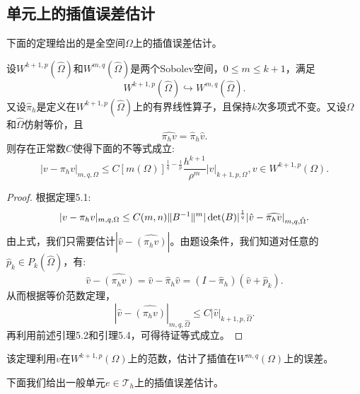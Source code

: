\subsection{单元上的插值误差估计}
下面的定理给出的是全空间$\Omega$上的插值误差估计。
\begin{theorem}
    设$W^{k+1,p}(\hat{\Omega})$和$W^{m,q}(\hat{\Omega})$是两个Sobolev空间，$0\le m\le k+1$，满足
    \begin{equation}
        W^{k+1,p}(\hat{\Omega})\hookrightarrow W^{m,q}(\hat{\Omega}).
    \end{equation}
    又设$\hat{\pi}_{h}$是定义在$W^{k+1,p}(\hat{\Omega})$上的有界线性算子，且保持$k$次多项式不变。又设$\Omega$和$\hat{\Omega}$仿射等价，且
    \begin{equation}
        \widehat{\pi_{h}v}=\hat{\pi}_{h}\hat{v}.
    \end{equation}
    则存在正常数$C$使得下面的不等式成立:
    \begin{equation}
        |v-\pi_{h}v|_{m,q,\Omega}\le C\left[m(\Omega)\right]^{\frac{1}{q}-\frac{1}{p}}\frac{h^{k+1}}{\rho^{m}}|v|_{k+1,p,\Omega},v\in W^{k+1,p}(\Omega).
    \end{equation}
\end{theorem}
\begin{proof}
    根据定理5.1:
    \begin{equation}
        |v-\pi_{h}v|_{m,q,\Omega}\le C(m,n)\|B^{-1}\|^{m}|\det(B)|^{\frac{1}{q}}|\hat{v}-\widehat{\pi_{h}v}|_{m,q,\hat{\Omega}}.
    \end{equation}
    由上式，我们只需要估计$|\hat{v}-\widehat{(\pi_{h}v)}|$。由题设条件，我们知道对任意的$\hat{p}_{k}\in P_{k}(\widehat{\Omega})$，有:
    \begin{equation}
        \hat{v}-\widehat{(\pi_{h}v)}=\hat{v}-\hat{\pi}_{h}\hat{v}=(I-\hat{\pi}_{h})(\hat{v}+\hat{p}_{k}).
    \end{equation}
    从而根据等价范数定理，
    \begin{equation}
        |\hat{v}-\widehat{(\pi_{h}v)}|_{m,q,\hat{\Omega}}\le C|\hat{v}|_{k+1,p,\hat{\Omega}}.
    \end{equation}
    再利用前述引理5.2和引理5.4，可得待证等式成立。
\end{proof}
\begin{remark}
    该定理利用$v$在$W^{k+1,p}(\Omega)$上的范数，估计了插值在$W^{m,q}(\Omega)$上的误差。
\end{remark}
下面我们给出一般单元$e\in\mathcal{T}_{h}$上的插值误差估计。

